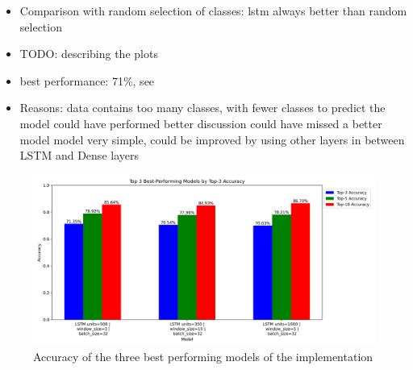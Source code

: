 \begin{itemize}
    \item Comparison with random selection of classes: lstm always better than random selection
    \item TODO: describing the plots
    \item best performance: 71\%, see 
    \item Reasons:
    \subitem data contains too many classes, with fewer classes to predict the model could have performed better
    \subitem discussion could have missed a better model
    \subitem model very simple, could be improved by using other layers in between LSTM and Dense layers
\end{itemize}

\begin{figure}[h!]
    \centering
    \includegraphics[scale=0.4]{images/top3_best_models.png}
    \caption{Accuracy of the three best performing models of the implementation}
    \label{fig:top3_best_models}
\end{figure}

